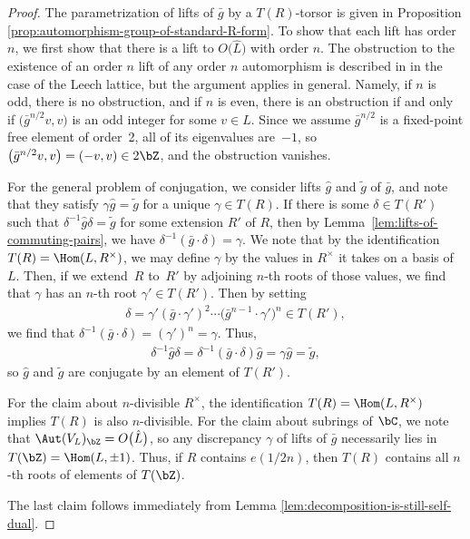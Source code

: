 \begin{proof}
The parametrization of lifts of $\bar{g}$ by a $T(R)$-torsor is given in Proposition \ref{prop:automorphism-group-of-standard-R-form}. To show that each lift has order $n$, we first show that there is a lift to $O\big(\hat{L}\big)$ with order $n$. The obstruction to the existence of an order $n$ lift of any order $n$ automorphism is described in \cite[Lemma~12.1]{B92} in the case of the Leech lattice, but the argument applies in general. Namely, if $n$ is odd, there is no obstruction, and if $n$ is even, there is an obstruction if and only if $\big(\bar{g}^{n/2}v,v\big)$ is an odd integer for some $v \in L$. Since we assume $\bar{g}^{n/2}$ is a fixed-point free element of order~2, all of its eigenvalues are~$-1$, so $\big(\bar{g}^{n/2}v,v\big) = (-v,v) \in 2\bZ$, and the obstruction vanishes.

For the general problem of conjugation, we consider lifts $\hat{g}$ and $\tilde{g}$ of $\bar{g}$, and note that they satisfy $\gamma \hat{g} = \tilde{g}$ for a unique $\gamma \in T(R)$. If there is some $\delta \in T(R')$ such that $\delta^{-1} \hat{g} \delta = \tilde{g}$ for some extension $R'$ of $R$, then by Lemma~\ref{lem:lifts-of-commuting-pairs}, we have $\delta^{-1}(\bar{g} \cdot \delta) = \gamma$. We note that by the identification $T(R) = \Hom(L,R^\times)$, we may define $\gamma$ by the values in $R^\times$ it takes on a basis of~$L$. Then, if we extend~$R$ to~$R'$ by adjoining $n$-th roots of those values, we find that $\gamma$ has an $n$-th root $\gamma' \in T(R')$. Then by setting
\begin{gather*} \delta = \gamma' (\bar{g} \cdot \gamma')^2 \cdots \big(\bar{g}^{n-1} \cdot \gamma'\big)^n \in T(R'), \end{gather*}
we find that $\delta^{-1}(\bar{g} \cdot \delta) = (\gamma')^n = \gamma$. Thus,
\begin{gather*} \delta^{-1} \hat{g} \delta = \delta^{-1} (\bar{g} \cdot \delta) \hat{g} = \gamma \hat{g} = \tilde{g}, \end{gather*}
so $\hat{g}$ and $\tilde{g}$ are conjugate by an element of $T(R')$.

For the claim about $n$-divisible $R^\times$, the identification $T(R) = \Hom(L,R^\times)$ implies $T(R)$ is also $n$-divisible. For the claim about subrings of $\bC$, we note that $\Aut(V_L)_\bZ = O\big(\hat{L}\big)$, so any discrepancy $\gamma$ of lifts of $\bar{g}$ necessarily lies in $T(\bZ) = \Hom(L,\pm 1)$. Thus, if $R$ contains $e(1/2n)$, then $T(R)$ contains all $n$-th roots of elements of $T(\bZ)$.

The last claim follows immediately from Lemma \ref{lem:decomposition-is-still-self-dual}.
\end{proof}

